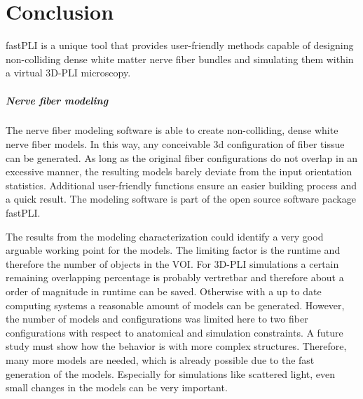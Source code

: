\chapter{Conclusion}
\label{sec:conclusion}
% 
% 
\ac{fastPLI} is a unique tool that provides user-friendly methods capable of designing non-colliding dense white matter nerve fiber bundles and simulating them within a virtual \ac{3D-PLI} microscopy.
% 
% 
% 
\paragraph{Nerve fiber modeling} %
The nerve fiber modeling software is able to create non-colliding, dense white nerve fiber models.
In this way, any conceivable 3d configuration of fiber tissue can be generated.
As long as the original fiber configurations do not overlap in an excessive manner, the resulting models barely deviate from the input orientation statistics.
Additional user-friendly functions ensure an easier building process and a quick result.
The modeling software is part of the open source software package \ac{fastPLI}.
\par
% 
The results from the modeling characterization could identify a very good arguable working point for the models.
The limiting factor is the runtime and therefore the number of objects in the \ac{VOI}.
For \ac{3D-PLI} simulations a certain remaining overlapping percentage is probably vertretbar and therefore about a order of magnitude in runtime can be saved.
Otherwise with a up to date computing systems a reasonable amount of models can be generated.
However, the number of models and configurations was limited here to two fiber configurations with respect to anatomical and simulation constraints.
A future study must show how the behavior is with more complex structures.
Therefore, many more models are needed, which is already possible due to the fast generation of the models.
Especially for simulations like scattered light, even small changes in the models can be very important.
%  
